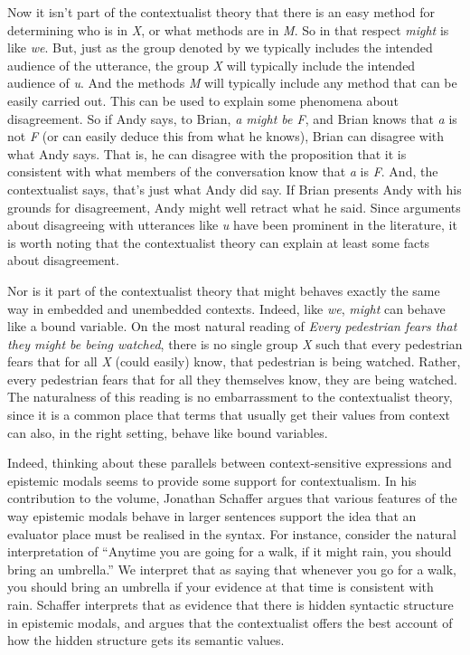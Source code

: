 \documentclass[
  10pt,
  letterpaper,
  DIV=11,
  numbers=noendperiod,
  twoside]{scrartcl}
\begin{document}
Now it isn't part of the contextualist theory that there is an easy
method for determining who is in \emph{X}, or what methods are in
\emph{M}. So in that respect \emph{might} is like \emph{we}. But, just
as the group denoted by we typically includes the intended audience of
the utterance, the group \emph{X} will typically include the intended
audience of \emph{u}. And the methods \emph{M} will typically include
any method that can be easily carried out. This can be used to explain
some phenomena about disagreement. So if Andy says, to Brian, \emph{a
might be F}, and Brian knows that \emph{a} is not \emph{F} (or can
easily deduce this from what he knows), Brian can disagree with what
Andy says. That is, he can disagree with the proposition that it is
consistent with what members of the conversation know that \emph{a} is
\emph{F}. And, the contextualist says, that's just what Andy did say. If
Brian presents Andy with his grounds for disagreement, Andy might well
retract what he said. Since arguments about disagreeing with utterances
like \emph{u} have been prominent in the literature, it is worth noting
that the contextualist theory can explain at least some facts about
disagreement.

Nor is it part of the contextualist theory that might behaves exactly
the same way in embedded and unembedded contexts. Indeed, like
\emph{we}, \emph{might} can behave like a bound variable. On the most
natural reading of \emph{Every pedestrian fears that they might be being
watched}, there is no single group \emph{X} such that every pedestrian
fears that for all \emph{X} (could easily) know, that pedestrian is
being watched. Rather, every pedestrian fears that for all they
themselves know, they are being watched. The naturalness of this reading
is no embarrassment to the contextualist theory, since it is a common
place that terms that usually get their values from context can also, in
the right setting, behave like bound variables.

Indeed, thinking about these parallels between context-sensitive
expressions and epistemic modals seems to provide some support for
contextualism. In his contribution to the volume, Jonathan Schaffer
argues that various features of the way epistemic modals behave in
larger sentences support the idea that an evaluator place must be
realised in the syntax. For instance, consider the natural
interpretation of ``Anytime you are going for a walk, if it might rain,
you should bring an umbrella.'' We interpret that as saying that
whenever you go for a walk, you should bring an umbrella if your
evidence at that time is consistent with rain. Schaffer interprets that
as evidence that there is hidden syntactic structure in epistemic
modals, and argues that the contextualist offers the best account of how
the hidden structure gets its semantic values.
\end{document}
